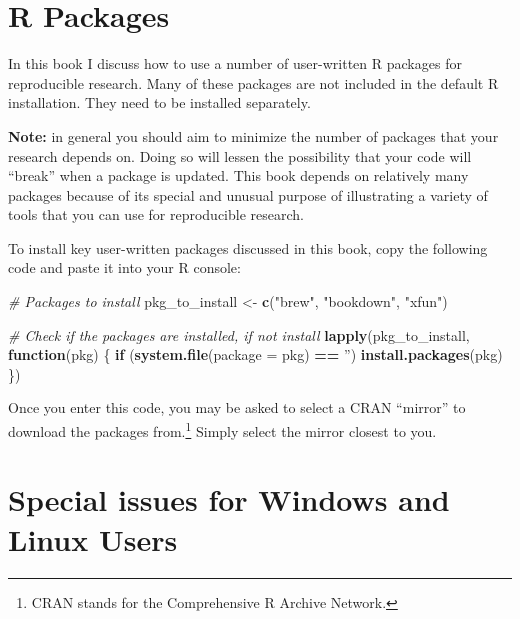 \documentclass[]{krantz}
\makeatletter
\newenvironment{Shaded}{\begin{snugshade}}{\end{snugshade}}
\newcommand{\CommentTok}[1]{\textcolor[rgb]{0.37,0.37,0.37}{\textit{#1}}}
\newcommand{\ControlFlowTok}[1]{\textcolor[rgb]{0.27,0.27,0.27}{\textbf{#1}}}
\newcommand{\DataTypeTok}[1]{\textcolor[rgb]{0.27,0.27,0.27}{#1}}
\newcommand{\KeywordTok}[1]{\textcolor[rgb]{0.27,0.27,0.27}{\textbf{#1}}}
\newcommand{\NormalTok}[1]{#1}
\newcommand{\OperatorTok}[1]{\textcolor[rgb]{0.43,0.43,0.43}{\textbf{#1}}}
\newcommand{\StringTok}[1]{\textcolor[rgb]{0.5,0.5,0.5}{#1}}
\newenvironment{kframe}{%
\medskip{}
\setlength{\fboxsep}{.8em}
 \def\at@end@of@kframe{}%
 \ifinner\ifhmode%
  \def\at@end@of@kframe{\end{minipage}}%
  \begin{minipage}{\columnwidth}%
 \fi\fi%
 \def\FrameCommand##1{\hskip\@totalleftmargin \hskip-\fboxsep
 \colorbox{shadecolor}{##1}\hskip-\fboxsep
     \hskip-\linewidth \hskip-\@totalleftmargin \hskip\columnwidth}%
 \MakeFramed {\advance\hsize-\width
   \@totalleftmargin\z@ \linewidth\hsize
   \@setminipage}}%
 {\par\unskip\endMakeFramed%
 \at@end@of@kframe}
\renewenvironment{Shaded}{\begin{kframe}}{\end{kframe}}
\theoremstyle{definition}
\theoremstyle{definition}
\theoremstyle{definition}
\theoremstyle{remark}
\makeatother
\begin{document}
\hypertarget{r-packages}{%
\section*{R Packages}\label{r-packages}}


In this book I discuss how to use a number of user-written R packages
for reproducible research. Many of these packages are not included in
the default R installation. They need to be installed separately.


\textbf{Note:} in general you should aim to minimize the number of
packages that your research depends on. Doing so will lessen the
possibility that your code will ``break'' when a package is updated.
This book depends on relatively many packages because of its special and
unusual purpose of illustrating a variety of tools that you can use for
reproducible research.

To install key user-written packages discussed in this book, copy the
following code and paste it into your R console:

\begin{Shaded}
\begin{Highlighting}[]
\CommentTok{# Packages to install}
\NormalTok{pkg_to_install <-}\StringTok{ }\KeywordTok{c}\NormalTok{(}\StringTok{"brew"}\NormalTok{, }\StringTok{"bookdown"}\NormalTok{, }\StringTok{"xfun"}\NormalTok{)}


\CommentTok{# Check if the packages are installed, if not install}
\KeywordTok{lapply}\NormalTok{(pkg_to_install,}
    \ControlFlowTok{function}\NormalTok{(pkg) \{}
  \ControlFlowTok{if}\NormalTok{ (}\KeywordTok{system.file}\NormalTok{(}\DataTypeTok{package =}\NormalTok{ pkg) }\OperatorTok{==}\StringTok{ ''}\NormalTok{) }\KeywordTok{install.packages}\NormalTok{(pkg)}
\NormalTok{\})}
\end{Highlighting}
\end{Shaded}


Once you enter this code, you may be asked to select a CRAN
``mirror'' to download the packages from.\footnote{CRAN
  stands for the Comprehensive R Archive Network.} Simply select the
mirror closest to you.

\hypertarget{special-issues-for-windows-and-linux-users}{%
\section*{Special issues for Windows and Linux
Users}\label{special-issues-for-windows-and-linux-users}}
\end{document}

